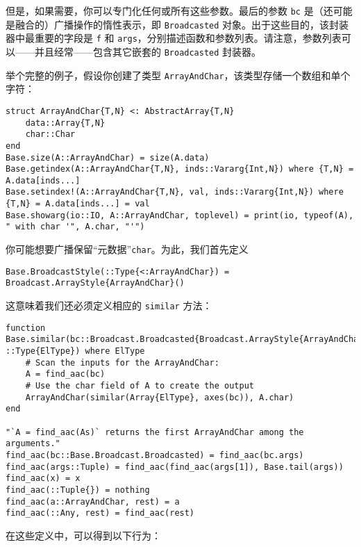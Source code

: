 但是，如果需要，你可以专门化任何或所有这些参数。最后的参数 \texttt{bc} 是（还可能是融合的）广播操作的惰性表示，即 \texttt{Broadcasted} 对象。出于这些目的，该封装器中最重要的字段是 \texttt{f} 和 \texttt{args}，分别描述函数和参数列表。请注意，参数列表可以——并且经常——包含其它嵌套的 \texttt{Broadcasted} 封装器。



举个完整的例子，假设你创建了类型 \texttt{ArrayAndChar}，该类型存储一个数组和单个字符：




\begin{verbatim}
struct ArrayAndChar{T,N} <: AbstractArray{T,N}
    data::Array{T,N}
    char::Char
end
Base.size(A::ArrayAndChar) = size(A.data)
Base.getindex(A::ArrayAndChar{T,N}, inds::Vararg{Int,N}) where {T,N} = A.data[inds...]
Base.setindex!(A::ArrayAndChar{T,N}, val, inds::Vararg{Int,N}) where {T,N} = A.data[inds...] = val
Base.showarg(io::IO, A::ArrayAndChar, toplevel) = print(io, typeof(A), " with char '", A.char, "'")
\end{verbatim}



你可能想要广播保留“元数据”\texttt{char}。为此，我们首先定义




\begin{verbatim}
Base.BroadcastStyle(::Type{<:ArrayAndChar}) = Broadcast.ArrayStyle{ArrayAndChar}()
\end{verbatim}



这意味着我们还必须定义相应的 \texttt{similar} 方法：




\begin{verbatim}
function Base.similar(bc::Broadcast.Broadcasted{Broadcast.ArrayStyle{ArrayAndChar}}, ::Type{ElType}) where ElType
    # Scan the inputs for the ArrayAndChar:
    A = find_aac(bc)
    # Use the char field of A to create the output
    ArrayAndChar(similar(Array{ElType}, axes(bc)), A.char)
end

"`A = find_aac(As)` returns the first ArrayAndChar among the arguments."
find_aac(bc::Base.Broadcast.Broadcasted) = find_aac(bc.args)
find_aac(args::Tuple) = find_aac(find_aac(args[1]), Base.tail(args))
find_aac(x) = x
find_aac(::Tuple{}) = nothing
find_aac(a::ArrayAndChar, rest) = a
find_aac(::Any, rest) = find_aac(rest)
\end{verbatim}



在这些定义中，可以得到以下行为：




